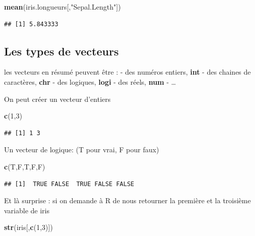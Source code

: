 \documentclass[
]{book}
\newenvironment{Shaded}{\begin{snugshade}}{\end{snugshade}}
\newcommand{\DecValTok}[1]{\textcolor[rgb]{0.00,0.00,0.81}{#1}}
\newcommand{\FunctionTok}[1]{\textcolor[rgb]{0.13,0.29,0.53}{\textbf{#1}}}
\newcommand{\NormalTok}[1]{#1}
\newcommand{\StringTok}[1]{\textcolor[rgb]{0.31,0.60,0.02}{#1}}
\begin{document}
\begin{Shaded}
\begin{Highlighting}[]
\FunctionTok{mean}\NormalTok{(iris.longueurs[,}\StringTok{"Sepal.Length"}\NormalTok{])}
\end{Highlighting}
\end{Shaded}

\begin{verbatim}
## [1] 5.843333
\end{verbatim}

\subsection{Les types de vecteurs}\label{les-types-de-vecteurs}

les vecteurs en résumé peuvent être :
- des numéros entiers, \textbf{int}
- des chaines de caractères, \textbf{chr}
- des logiques, \textbf{logi}
- des réels, \textbf{num}
- \ldots{}

On peut créer un vecteur d'entiers

\begin{Shaded}
\begin{Highlighting}[]
\FunctionTok{c}\NormalTok{(}\DecValTok{1}\NormalTok{,}\DecValTok{3}\NormalTok{)}
\end{Highlighting}
\end{Shaded}

\begin{verbatim}
## [1] 1 3
\end{verbatim}

Un vecteur de logique: (T pour vrai, F pour faux)

\begin{Shaded}
\begin{Highlighting}[]
\FunctionTok{c}\NormalTok{(T,F,T,F,F)}
\end{Highlighting}
\end{Shaded}

\begin{verbatim}
## [1]  TRUE FALSE  TRUE FALSE FALSE
\end{verbatim}

Et là surprise : si on demande à R de nous retourner la première et la troisième
variable de iris

\begin{Shaded}
\begin{Highlighting}[]
\FunctionTok{str}\NormalTok{(iris[,}\FunctionTok{c}\NormalTok{(}\DecValTok{1}\NormalTok{,}\DecValTok{3}\NormalTok{)])}
\end{Highlighting}
\end{Shaded}
\end{document}
